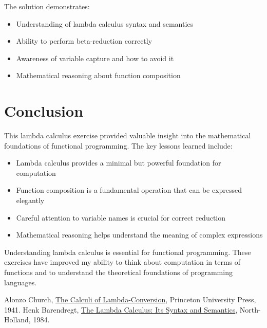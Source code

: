 \documentclass{article}
\theoremstyle{plain}
\theoremstyle{definition}
\theoremstyle{remark}
\begin{document}
The solution demonstrates:
\begin{itemize}
\item Understanding of lambda calculus syntax and semantics
\item Ability to perform beta-reduction correctly
\item Awareness of variable capture and how to avoid it
\item Mathematical reasoning about function composition
\end{itemize}

\section{Conclusion}\label{conclusion}

This lambda calculus exercise provided valuable insight into the mathematical foundations of functional programming. The key lessons learned include:

\begin{itemize}
\item Lambda calculus provides a minimal but powerful foundation for computation
\item Function composition is a fundamental operation that can be expressed elegantly
\item Careful attention to variable names is crucial for correct reduction
\item Mathematical reasoning helps understand the meaning of complex expressions
\end{itemize}

Understanding lambda calculus is essential for functional programming. These exercises have improved my ability to think about computation in terms of functions and to understand the theoretical foundations of programming languages.

\begin{thebibliography}{99}
 Alonzo Church, \href{https://en.wikipedia.org/wiki/Lambda_calculus}{The Calculi of Lambda-Conversion}, Princeton University Press, 1941.
 Henk Barendregt, \href{https://en.wikipedia.org/wiki/Lambda_calculus}{The Lambda Calculus: Its Syntax and Semantics}, North-Holland, 1984.
\end{thebibliography}
\end{document}
